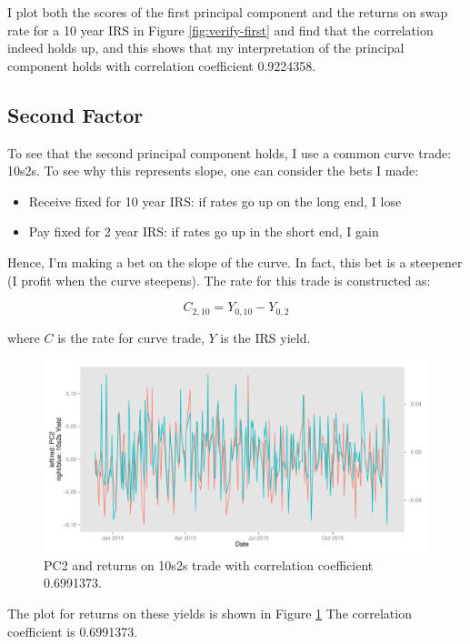 \documentclass[11pt]{scrreprt}
\begin{document}
I plot both the scores of the first principal component and the returns on swap rate for a 10 year IRS in Figure \ref{fig:verify-first} and find that the correlation indeed holds up, and this shows that my interpretation of the principal component holds with correlation coefficient 0.9224358.

\subsection{Second Factor}

To see that the second principal component holds, I use a common curve trade: 10s2s. To see why this represents slope, one can consider the bets I made:

\begin{itemize}
\item Receive fixed for 10 year IRS: if rates go up on the long end, I lose
\item Pay fixed for 2 year IRS: if rates go up in the short end, I gain
\end{itemize}

Hence, I'm making a bet on the slope of the curve. In fact, this bet is a steepener (I profit when the curve steepens). The rate for this trade is constructed as:

\[C_{2, 10} = Y_{0, 10} - Y_{0, 2}\]

where $C$ is the rate for curve trade, $Y$ is the IRS yield.

\begin{figure}[H]
\centering\includegraphics[width=\textwidth]{verify-second.pdf}
\caption{PC2 and returns on 10s2s trade with correlation coefficient 0.6991373.}
\label{fig:verify-second}
\end{figure}

The plot for returns on these yields is shown in Figure \ref{fig:verify-second} The correlation coefficient is 0.6991373.
\end{document}
